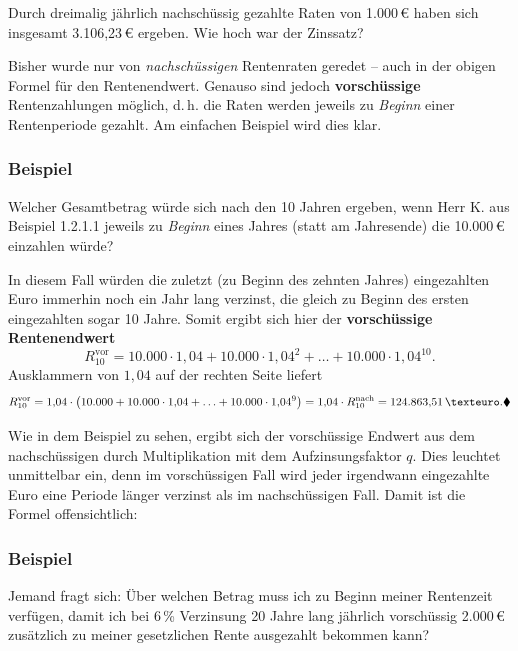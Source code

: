 \begin{graukasten}
  Durch dreimalig jährlich nachschüssig gezahlte Raten von 1.000\,€ haben sich insgesamt 3.106{,}23\,€ ergeben. Wie hoch war der Zinssatz?
\end{graukasten}

Bisher wurde nur von \emph{nachschüssigen} Rentenraten geredet -- auch in der obigen Formel für den Rentenendwert. Genauso sind jedoch \textbf{vorschüssige} Rentenzahlungen möglich, d.\,h. die Raten werden jeweils zu \emph{Beginn} einer Rentenperiode gezahlt. Am einfachen Beispiel wird dies klar.

\subsubsection{Beispiel}

Welcher Gesamtbetrag würde sich nach den 10 Jahren ergeben, wenn Herr K. aus Beispiel 1.2.1.1 jeweils zu \emph{Beginn} eines Jahres (statt am Jahresende) die 10.000\,€ einzahlen würde?

In diesem Fall würden die zuletzt (zu Beginn des zehnten Jahres) eingezahlten Euro immerhin noch ein Jahr lang verzinst, die gleich zu Beginn des ersten eingezahlten sogar 10 Jahre. Somit ergibt sich hier der \textbf{vorschüssige Rentenendwert}
\[ R_{10}^{\text{vor}} = 10.000 \cdot 1{,}04 + 10.000 \cdot 1{,}04^2 + \ldots + 10.000 \cdot 1{,}04^{10} . \]
Ausklammern von $1{,}04$ auf der rechten Seite liefert
\[ R_{10}^{\text{vor}} = 1{,}04 \cdot \left(10.000 + 10.000 \cdot 1{,}04 + \ldots + 10.000 \cdot 1{,}04^9\right) = 1{,}04 \cdot R_{10}^{\text{nach}} = 124.863{,}51\,€ .\beispielende \]

Wie in dem Beispiel zu sehen, ergibt sich der vorschüssige Endwert aus dem nachschüssigen durch Multiplikation mit dem Aufzinsungsfaktor $q$. Dies leuchtet unmittelbar ein, denn im vorschüssigen Fall wird jeder irgendwann eingezahlte Euro eine Periode länger verzinst als im nachschüssigen Fall. Damit ist die Formel offensichtlich:

\subsubsection{Beispiel}

Jemand fragt sich: Über welchen Betrag muss ich zu Beginn meiner Rentenzeit verfügen, damit ich bei 6\,\% Verzinsung 20 Jahre lang jährlich vorschüssig 2.000\,€ zusätzlich zu meiner gesetzlichen Rente ausgezahlt bekommen kann?

